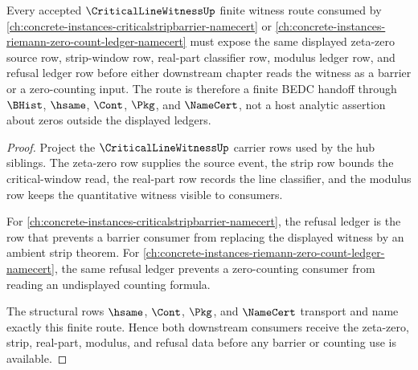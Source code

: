 \begin{theorem}
\label{thm:criticallinewitness-cross-lattice-route}
Every accepted $\CriticalLineWitnessUp$ finite witness route consumed by \autoref{ch:concrete-instances-criticalstripbarrier-namecert} or \autoref{ch:concrete-instances-riemann-zero-count-ledger-namecert} must expose the same displayed zeta-zero source row, strip-window row, real-part classifier row, modulus ledger row, and refusal ledger row before either downstream chapter reads the witness as a barrier or a zero-counting input. The route is therefore a finite BEDC handoff through $\BHist$, $\hsame$, $\Cont$, $\Pkg$, and $\NameCert$, not a host analytic assertion about zeros outside the displayed ledgers.
\end{theorem}
\begin{proof}
Project the $\CriticalLineWitnessUp$ carrier rows used by the hub siblings. The zeta-zero row supplies the source event, the strip row bounds the critical-window read, the real-part row records the line classifier, and the modulus row keeps the quantitative witness visible to consumers.

For \autoref{ch:concrete-instances-criticalstripbarrier-namecert}, the refusal ledger is the row that prevents a barrier consumer from replacing the displayed witness by an ambient strip theorem. For \autoref{ch:concrete-instances-riemann-zero-count-ledger-namecert}, the same refusal ledger prevents a zero-counting consumer from reading an undisplayed counting formula.

The structural rows $\hsame$, $\Cont$, $\Pkg$, and $\NameCert$ transport and name exactly this finite route. Hence both downstream consumers receive the zeta-zero, strip, real-part, modulus, and refusal data before any barrier or counting use is available.
\end{proof}
